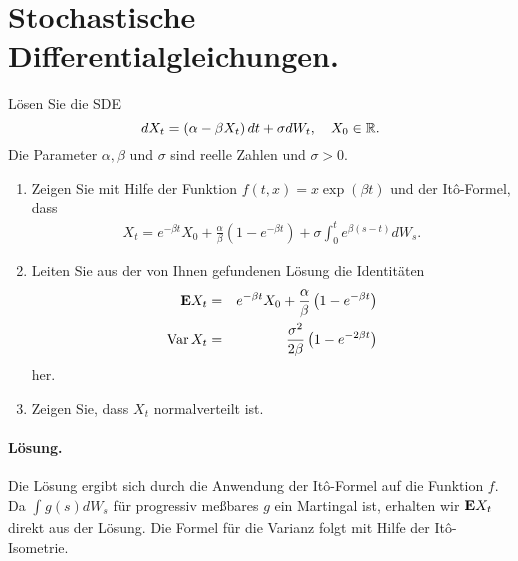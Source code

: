 \section{Stochastische Differentialgleichungen. }

 Lösen Sie die \textsc{SDE}
\begin{equation}
    dX_t = \left( \alpha-\beta X_t \right)dt + \sigma dW_t, \quad X_0\in\mathbb R.
\end{equation}
Die Parameter $\alpha, \beta$ und $\sigma$ sind reelle Zahlen und $\sigma>0$. 
\begin{enumerate}
    \item Zeigen Sie mit Hilfe der Funktion $f(t,x)=x\exp(\beta t)$ und der It\^o-Formel, dass
        \begin{eqnarray}
            X_t = e^{-\beta t} X_0 + \frac{\alpha}{\beta}\left( 1-e^{-\beta t} \right)
                       + \sigma \int_{0}^{t} e^{\beta(s-t)} d W_s.
        \end{eqnarray}
    \item Leiten Sie aus der von Ihnen gefundenen Lösung die Identitäten
        \begin{eqnarray}
            \mathbf{E} X_t &=& e^{-\beta t} X_0 + \frac{\alpha}{\beta}\left( 1-e^{-\beta t} \right) \\
            \operatorname{Var} X_t &=& \frac{\sigma^2}{2\beta}\left( 1- e^{-2\beta t} \right)
        \end{eqnarray} 
        her.
    \item Zeigen Sie, dass $X_t$ normalverteilt ist. 
\end{enumerate}

\paragraph*{Lösung. } Die Lösung ergibt sich durch die Anwendung der It\^o-Formel
auf die Funktion $f$. Da $\int_{}^{} g(s) d W_s$ für progressiv meßbares $g$ ein
Martingal ist, erhalten wir $\mathbf{E} X_t$ direkt aus der Lösung. Die Formel für die 
Varianz folgt mit Hilfe der It\^o-Isometrie.



